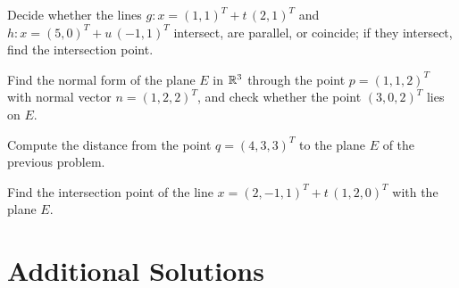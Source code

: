 \begin{problems}
  \item Decide whether the lines $g\colon x = (1, 1)^{T} + t \, (2, 1)^{T}$ and $h\colon x = (5, 0)^{T} + u \, (-1, 1)^{T}$ intersect, are parallel, or coincide; if they intersect, find the intersection point.
  \item Find the normal form of the plane $E$ in $\mathbb{R}^{3}$ through the point $p = (1, 1, 2)^{T}$ with normal vector $n = (1, 2, 2)^{T}$, and check whether the point $(3, 0, 2)^{T}$ lies on $E$.
  \item Compute the distance from the point $q = (4, 3, 3)^{T}$ to the plane $E$ of the previous problem.
  \item Find the intersection point of the line $x = (2, -1, 1)^{T} + t \, (1, 2, 0)^{T}$ with the plane $E$.
\end{problems}

\section{Additional Solutions}

